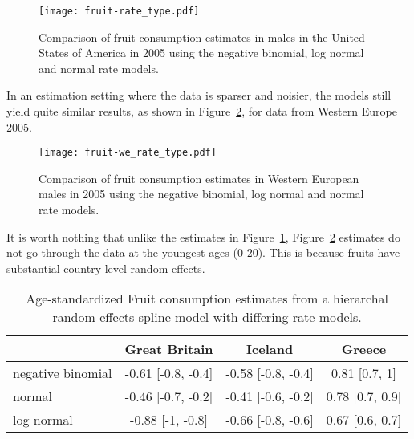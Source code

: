     \begin{figure}[h]
        \begin{center}
            \texttt{[image: fruit-rate\_type.pdf]}
            \caption{Comparison of fruit consumption estimates in
              males in the United States of America in 2005 using the
              negative binomial, log normal and normal rate models.}
            \label{fig:app-fruit rate type}
        \end{center}
    \end{figure}

In an estimation setting where the data is sparser and noisier, the
models still yield quite similar results, as shown in Figure~\ref{fig:app-fruit europe},
for data from Western Europe 2005.

    \begin{figure}[h]
        \begin{center}
            \texttt{[image: fruit-we\_rate\_type.pdf]}
            \caption{Comparison of fruit consumption estimates in
              Western European males in 2005 using the
              negative binomial, log normal and normal rate models.}
            \label{fig:app-fruit europe}
        \end{center}
    \end{figure}

It is worth nothing that unlike the estimates in Figure~\ref{fig:app-fruit rate type}, 
Figure~\ref{fig:app-fruit europe} estimates do not go through the data at the youngest
ages (0-20).  This is because fruits have substantial country level random effects.

    \begin{table}[h]
        \begin{center}
        \begin{tabular}{|p{1.7cm}|c|c|c|}
            \hline
                & Great Britain & Iceland & Greece \\
            \hline
                negative binomial & -0.61 [-0.8, -0.4] & -0.58 [-0.8, -0.4] & 0.81 [0.7, 1] \\
                normal & -0.46 [-0.7, -0.2] & -0.41 [-0.6, -0.2] & 0.78 [0.7, 0.9] \\
                log normal & -0.88 [-1, -0.8] & -0.66 [-0.8, -0.6] & 0.67 [0.6, 0.7] \\
            \hline
        \end{tabular}
        \end{center}
        \caption{ Age-standardized Fruit consumption estimates
          from a hierarchal random effects spline model with differing
          rate models.}
        \label{tab:app-fruit rfx}
    \end{table}



